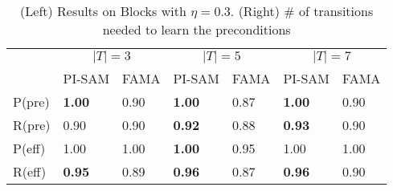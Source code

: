 \documentclass{article}
\theoremstyle{plain}
\theoremstyle{definition}
\theoremstyle{remark}
\theoremstyle{observation}
\begin{document}
\begin{table}[b]
\centering
\setlength{\tabcolsep}{1.5pt}
\begin{small}
    \begin{tabular}{@{}l|ll|ll|ll@{}}
\toprule
       & \multicolumn{2}{c|}{$\mathcal|{T}|=3$} & \multicolumn{2}{c|}{$\mathcal|{T}|=5$} & \multicolumn{2}{c}{$\mathcal|{T}|=7$} \\ 
       & PI-SAM     & FAMA      & PI-SAM     & FAMA     & PI-SAM     & FAMA     \\ \midrule
P(pre) & \textbf{1.00}       & 0.90      & \textbf{1.00}       & 0.87     & \textbf{1.00}       & 0.90      \\
R(pre) & 0.90               & 0.90      & \textbf{0.92}       & 0.88     & \textbf{0.93}       & 0.90      \\
P(eff) & 1.00               & 1.00      & \textbf{1.00}       & 0.95     & 1.00       & 1.00        \\
R(eff) & \textbf{0.95}       & 0.89      & \textbf{0.96}       & 0.87     & \textbf{0.96}       & 0.90      \\ \bottomrule
\end{tabular}
\end{small}
\qquad
{}
\caption{\small (Left) Results on Blocks with $\eta = 0.3$. 
(Right) \# of transitions needed to learn the preconditions}
\label{tab:joint-results}
\end{table}
\end{document}

